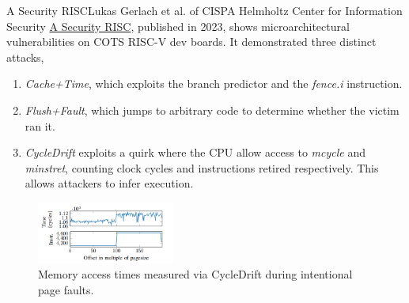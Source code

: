 \begin{frame}{A Security RISC}{Lukas Gerlach et al. of CISPA Helmholtz Center for Information Security}
    \label{a-security-risc} \href{https://publications.cispa.saarland/3924/1/security_risc.pdf}{\color{pink}A Security RISC}, published in 2023, shows microarchitectural vulnerabilities on COTS RISC-V dev boards. It demonstrated three distinct attacks,
    \begin{enumerate}
        \item \textit{Cache+Time}, which exploits the branch predictor and the \textit{fence.i} instruction.
        \item \textit{Flush+Fault}, which jumps to arbitrary code to determine whether the victim ran it.
        \item \textit{CycleDrift} exploits a quirk where the CPU allow access to \textit{mcycle} and \textit{minstret}, counting clock cycles and instructions retired respectively. This allows attackers to infer execution.
    \end{enumerate}
    \begin{figure}
        \centering
        \includegraphics[width=0.4\textwidth]{images/asecurity_risc_graphic.png}
        \caption{Memory access times measured via CycleDrift during intentional page faults.}
        \label{fig:asecurity-risc-fault}
    \end{figure}
\end{frame}